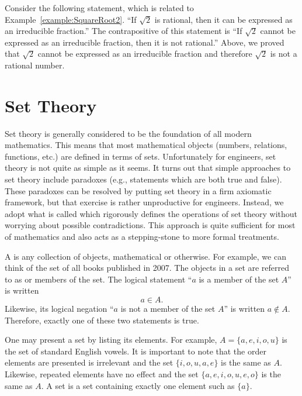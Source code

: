 \begin{example}
Consider the following statement, which is related to Example~\ref{example:SquareRoot2}.
``If $\sqrt{2}$ is rational, then it can be expressed as an irreducible fraction.''
The contrapositive of this statement is ``If $\sqrt{2}$ cannot be expressed as an irreducible fraction, then it is not rational.''
Above, we proved that $\sqrt{2}$ cannot be expressed as an irreducible fraction and therefore $\sqrt{2}$ is not a rational number.
\end{example}

\section{Set Theory}

Set theory is generally considered to be the foundation of all modern mathematics.
This means that most mathematical objects (numbers, relations, functions, etc.) are defined in terms of sets.
Unfortunately for engineers, set theory is not quite as simple as it seems.
It turns out that simple approaches to set theory include paradoxes (e.g., statements which are both true and false).
These paradoxes can be resolved by putting set theory in a firm axiomatic framework, but that exercise is rather unproductive for engineers.
Instead, we adopt what is called  which rigorously defines the operations of set theory without worrying about possible contradictions.
This approach is quite sufficient for most of mathematics and also acts as a stepping-stone to more formal treatments.

A  is any collection of objects, mathematical or otherwise.
For example, we can think of the set of all books published in 2007.
The objects in a set are referred to as  or members of the set.
The logical statement ``$a$ is a member of the set $A$'' is written
\[ a \in A. \]
Likewise, its logical negation ``$a$ is not a member of the set $A$'' is written $a \notin A$.
Therefore, exactly one of these two statements is true.

One may present a set by listing its elements.
For example, $A= \{ a,e,i,o,u \}$ is the set of standard English vowels.
It is important to note that the order elements are presented is irrelevant and the set $\{ i,o,u,a,e \}$ is the same as $A$.
Likewise, repeated elements have no effect and the set $\{ a,e,i,o,u,e,o \}$ is the same as $A$.
A  set is a set containing exactly one element such as $\{a\}$.

